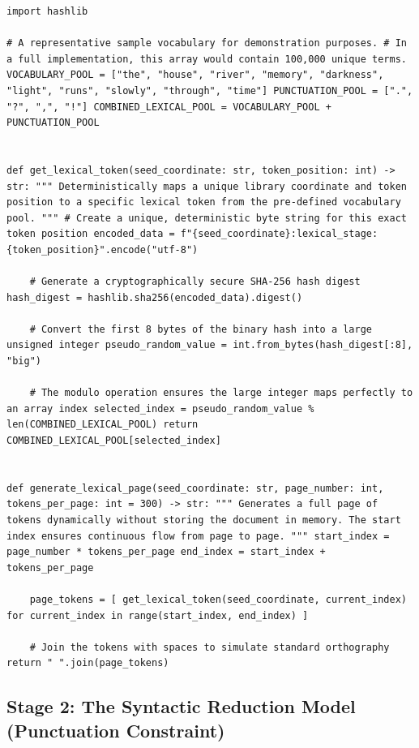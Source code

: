 \documentclass[
  11pt,
  a4paper,
]{article}
\begin{document}
\begin{lstlisting}[style=babelpython]
import hashlib

# A representative sample vocabulary for demonstration purposes. # In a full implementation, this array would contain 100,000 unique terms. VOCABULARY_POOL = ["the", "house", "river", "memory", "darkness", "light", "runs", "slowly", "through", "time"] PUNCTUATION_POOL = [".", "?", ",", "!"] COMBINED_LEXICAL_POOL = VOCABULARY_POOL + PUNCTUATION_POOL


def get_lexical_token(seed_coordinate: str, token_position: int) -> str: """ Deterministically maps a unique library coordinate and token position to a specific lexical token from the pre-defined vocabulary pool. """ # Create a unique, deterministic byte string for this exact token position encoded_data = f"{seed_coordinate}:lexical_stage:{token_position}".encode("utf-8")

    # Generate a cryptographically secure SHA-256 hash digest hash_digest = hashlib.sha256(encoded_data).digest()

    # Convert the first 8 bytes of the binary hash into a large unsigned integer pseudo_random_value = int.from_bytes(hash_digest[:8], "big")

    # The modulo operation ensures the large integer maps perfectly to an array index selected_index = pseudo_random_value % len(COMBINED_LEXICAL_POOL) return COMBINED_LEXICAL_POOL[selected_index]


def generate_lexical_page(seed_coordinate: str, page_number: int, tokens_per_page: int = 300) -> str: """ Generates a full page of tokens dynamically without storing the document in memory. The start index ensures continuous flow from page to page. """ start_index = page_number * tokens_per_page end_index = start_index + tokens_per_page

    page_tokens = [ get_lexical_token(seed_coordinate, current_index) for current_index in range(start_index, end_index) ]

    # Join the tokens with spaces to simulate standard orthography return " ".join(page_tokens) \end{lstlisting}

\subsection{Stage 2: The Syntactic Reduction Model (Punctuation Constraint)}\label{stage-2-the-syntactic-reduction-model-punctuation-constraint}
\end{document}
